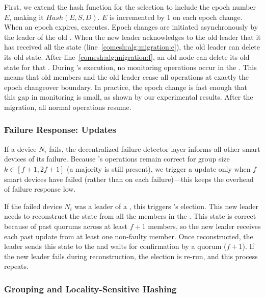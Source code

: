 First, we extend the hash function for the selection to include the epoch number $E$, making it $Hash (E, S, D)$. $E$ is incremented by 1 on each epoch change. When an epoch expires,  executes.
Epoch changes are initiated asynchronously by the leader of the old \kgroup{}.
When the new \kgroup{} leader acknowledges to the old \kgroup{} leader 
that it has received all the state (line~\ref{comesh:alg:migration:e}), the old \kgroup{} leader can delete its old \kgroup{} state. After line~\ref{comesh:alg:migration:f}, an old \kgroup{} node can delete its old state for that \kgroup{}. During 's execution,
no monitoring operations occur in the \kgroup{}. This means that old \kgroup{} members and the old leader cease all \kgroup{} operations at exactly the epoch changeover boundary. In practice, the epoch change is fast enough that this gap in monitoring
is small, as shown by our experimental results.
After the migration, all normal \kgroup{} operations resume. 

\subsubsection{Failure Response: \Kgroup{} Updates}
\label{comesh:subsection:fault-tolerance}

If a device $N_i$ fails, the decentralized failure detector layer informs all other smart devices of its failure. Because \sysname{}'s operations remain correct for group size $k \in [f+1, 2f+1]$ (a majority is still present), we trigger a \kgroup{} update only when $f$ smart devices have failed (rather than on each failure)---this keeps the overhead of failure response low.

If the failed device $N_i$ was a leader of a \kgroup{},  this triggers  's election.  
This new leader needs to reconstruct the state from all the members in the \kgroup{}. This state is correct because of past quorums across
at least $f+1$ \kgroup{} members, so the new leader receives each past update from at least one non-faulty member.
Once reconstructed, the leader sends this state to the \kgroup{} and waits for confirmation by a quorum ($f+1$). 
If the new leader fails during reconstruction, the election is re-run, and this process repeats.

\subsubsection{Grouping and Locality-Sensitive Hashing}
\label{comesh:subsection:lsh}

